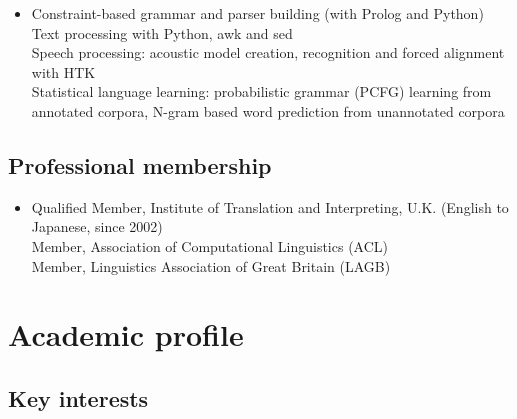 \documentclass[a4paper]{article}
\begin{document}
\begin{itemize}
\item Constraint-based grammar and parser building (with Prolog and Python)\\
  Text processing with Python, awk and sed\\
  Speech processing: acoustic model creation, recognition and forced alignment with HTK\\
  Statistical language learning: probabilistic grammar (PCFG) learning from annotated corpora, N-gram based word prediction from unannotated corpora


\end{itemize}
\vspace{-5mm}

\subsection*{Professional membership}

\begin{itemize}
\item Qualified Member, Institute of Translation and
  Interpreting, U.K. (English to Japanese, since 2002)\\
Member, Association of Computational Linguistics (ACL)
\\
 Member, Linguistics Association of Great Britain (LAGB)
\end{itemize}

\vspace{-4mm}

\section*{Academic profile}

\vspace{-1mm}

\subsection*{Key interests}
\end{document}
